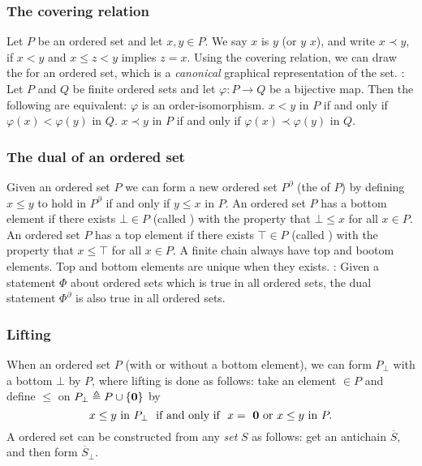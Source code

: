 \subsubsection{The covering relation}
\bit
\w Let $P$ be an ordered set and let $x, y \in P$. We say $x$ is  $y$ (or $y$  $x$), and write $x \prec y$, if $x < y$ and $x
\le z < y$ implies $z = x$.
\w Using the covering relation, we can draw the  for an
  ordered set, which is a {\em canonical\/} graphical representation of the set.
: Let $P$ and $Q$ be finite ordered sets and let $\varphi: P
\rightarrow Q$ be a bijective map. Then the following are equivalent:
 \ben
 \w [(a)] $\varphi$ is an order-isomorphism.
 \w [(b)] $x < y$ in $P$ if and only if $\varphi(x) < \varphi(y)$ in $Q$.
 \w [(c)] $x \prec y$ in $P$ if and only if 
      $\varphi(x) \prec \varphi(y)$ in $Q$.
 \een
\eit
\subsubsection{The dual of an ordered set}
\bit
\w Given an ordered set $P$ we can form a new ordered set $P^{\partial}$ (the
 of $P$) by defining $x \le y$ to hold in $P^\partial$ if and only if
$y \le x$ in $P$.
\w An ordered set $P$ has a bottom element if there exists $\bot \in P$
(called ) with the property that $\bot \le x$ for all $x \in P$.
\w An ordered set $P$ has a top element if there exists $\top \in P$
(called ) with the property that $x \le \top$ for all $x \in P$.
\w A finite chain always have top and bootom elements.
\w Top and bottom elements are unique when they exists.
: Given a statement $\Phi$ about ordered sets
which is true in all ordered sets, the dual statement $\Phi^\partial$ 
is also true in
all ordered sets.
\eit
\subsubsection{Lifting}
\bit
\w When an ordered set $P$ (with or without a bottom element), 
  we can form $P_{\bot}$ with a bottom $\bot$ by  $P$, where
  lifting is done as follows:
  take an element  $\in P$ and define $\le$ on $P_\bot \triangleq P \cup
  \{\mbox{{\bf{0}}}\}$ by
 \[ x \le y \mbox{\ in\ } P_\bot
  \mbox{\ \ if and only if\ \ } x = \mbox{\ {\bf{0}}  or\ }
  x \le y \mbox{\ in\ } P.\]
\w A  ordered set can be constructed from any {\em set\/} $S$ 
  as follows: get an antichain $\overline{S}$, and then form
  $\overline{S}_\bot$. 
\eit

